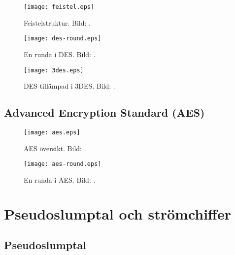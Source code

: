 \documentclass{beamer}
\theoremstyle{definition}
\begin{document}
\begin{frame}{\insertsubsectionhead}
  \begin{figure}
    \texttt{[image: feistel.eps]}
    \caption{Feistelstruktur.
    Bild: \cite{Stallings2011can}.}
  \end{figure}
\end{frame}

\begin{frame}{\insertsubsectionhead}
  \begin{figure}
    \texttt{[image: des-round.eps]}
    \caption{En runda i DES.
    Bild: \cite{Stallings2011can}.}
  \end{figure}
\end{frame}

\begin{frame}{\insertsubsectionhead}
  \begin{figure}
    \texttt{[image: 3des.eps]}
    \caption{DES tillämpad i 3DES.
    Bild: \cite{Stallings2011can}.}
  \end{figure}
\end{frame}

\subsection{Advanced Encryption Standard (AES)}

\begin{frame}{\insertsubsectionhead}
  \begin{figure}
    \texttt{[image: aes.eps]}
    \caption{AES översikt.
    Bild: \cite{Stallings2011can}.}
  \end{figure}
\end{frame}

\begin{frame}{\insertsubsectionhead}
  \begin{figure}
    \texttt{[image: aes-round.eps]}
    \caption{En runda i AES.
    Bild: \cite{Stallings2011can}.}
  \end{figure}
\end{frame}

\section{Pseudoslumptal och strömchiffer}

\subsection{Pseudoslumptal}
\end{document}
